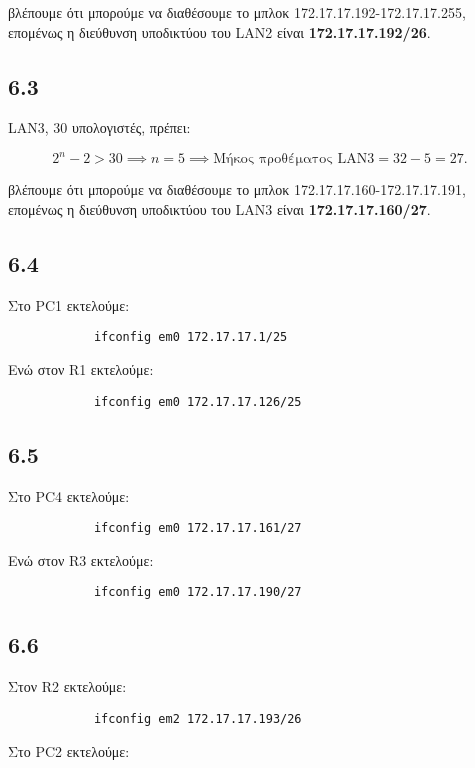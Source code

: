 \documentclass[a4paper, 12pt]{article}
\begin{document}
		βλέπουμε ότι μπορούμε να διαθέσουμε το μπλοκ 172.17.17.192-172.17.17.255, επομένως η διεύθυνση υποδικτύου του LAN2 είναι \textbf{172.17.17.192/26}.

	\subsection*{6.3}
		LAN3, $30$ υπολογιστές, πρέπει: 
		
		\[
			2^n-2>30 \implies n = 5 \implies \text{Μήκος προθέματος LAN3} = 32 - 5 = 27. 
		\]
		
		βλέπουμε ότι μπορούμε να διαθέσουμε το μπλοκ 172.17.17.160-172.17.17.191, επομένως η διεύθυνση υποδικτύου του LAN3 είναι \textbf{172.17.17.160/27}.

	\subsection*{6.4}
		Στο PC1 εκτελούμε: 
		
		\begin{verbatim}
			ifconfig em0 172.17.17.1/25
		\end{verbatim}
		
		Eνώ στον R1 εκτελούμε:
		
		\begin{verbatim}
			ifconfig em0 172.17.17.126/25
		\end{verbatim}
		
	\subsection*{6.5}
		Στο PC4 εκτελούμε:
		
		\begin{verbatim}
			ifconfig em0 172.17.17.161/27
		\end{verbatim}
		
		Eνώ στον R3 εκτελούμε:
		
		\begin{verbatim}
			ifconfig em0 172.17.17.190/27
		\end{verbatim}

	\subsection*{6.6}
		Στον R2 εκτελούμε:
		
		\begin{verbatim}
			ifconfig em2 172.17.17.193/26
		\end{verbatim}
		
		Στο PC2 εκτελούμε:
		
\end{document}
